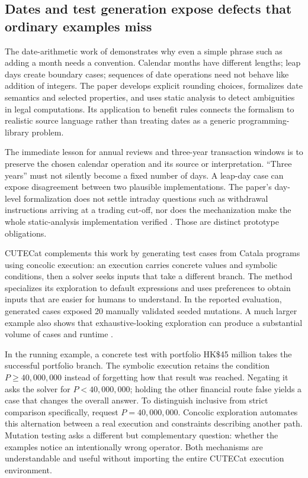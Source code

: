 

\subsection{Dates and test generation expose defects that ordinary examples miss}

The date-arithmetic work of \citet{dates2024} demonstrates why even a simple phrase
such as adding a month needs a convention. Calendar months have different
lengths; leap days create boundary cases; sequences of date operations need not
behave like addition of integers. The paper develops explicit rounding choices,
formalizes date semantics and selected properties, and uses static analysis to
detect ambiguities in legal computations. Its application to benefit rules
connects the formalism to realistic source language rather than treating dates
as a generic programming-library problem.

The immediate lesson for annual reviews and three-year transaction windows is
to preserve the chosen calendar operation and its source or interpretation.
``Three years'' must not silently become a fixed number of days. A leap-day case
can expose disagreement between two plausible implementations. The paper's
day-level formalization does not settle intraday questions such as withdrawal
instructions arriving at a trading cut-off, nor does the mechanization make the
whole static-analysis implementation verified
\citep[secs.~2--6]{dates2024}. Those are distinct prototype obligations.

CUTECat complements this work by generating test cases from Catala programs using
concolic execution: an execution carries concrete values and symbolic conditions,
then a solver seeks inputs that take a different branch. The method specializes
its exploration to default expressions and uses preferences to obtain inputs
that are easier for humans to understand. In the reported evaluation, generated
cases exposed 20 manually validated seeded mutations. A much larger example also
shows that exhaustive-looking exploration can produce a substantial volume of
cases and runtime \citep[secs.~3--5]{cutecat2025}.

In the running example, a concrete test with portfolio HK\$45 million takes
the successful portfolio branch. The symbolic execution retains the condition
$P\geq 40{,}000{,}000$ instead of forgetting how that result was reached.
Negating it asks the solver for $P<40{,}000{,}000$; holding the other financial
route false yields a case that changes the overall answer. To distinguish
inclusive from strict comparison specifically, request $P=40{,}000{,}000$.
Concolic exploration automates this alternation between a real execution and
constraints describing another path. Mutation testing asks a different but
complementary question: whether the examples notice an intentionally wrong
operator. Both mechanisms are understandable and useful without importing
the entire CUTECat execution environment.

